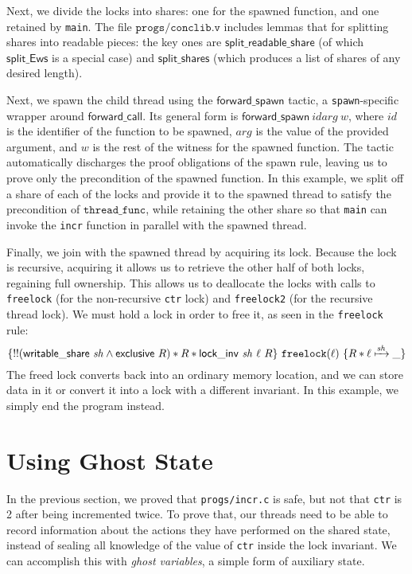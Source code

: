 \documentclass[11pt]{article} %
\begin{document}
Next, we divide the locks into shares: one for the spawned function, and one retained by \texttt{main}. The file $\texttt{progs/conclib.v}$ includes lemmas that for splitting shares into readable pieces: the key ones are $\mathsf{split\_readable\_share}$ (of which $\mathsf{split\_Ews}$ is a special case) and $\mathsf{split\_shares}$ (which produces a list of shares of any desired length).

Next, we spawn the child thread using the $\mathsf{forward\_spawn}$ tactic, a \texttt{spawn}-specific wrapper around $\mathsf{forward\_call}$. Its general form is $\mathsf{forward\_spawn}\ \mathit{id} \mathit{arg}\ \mathit{w}$, where $\mathit{id}$ is the identifier of the function to be spawned, $\mathit{arg}$ is the value of the provided argument, and $\mathit{w}$ is the rest of the witness for the spawned function. The tactic automatically discharges the proof obligations of the spawn rule, leaving us to prove only the precondition of the spawned function. In this example, we split off a share of each of the locks and provide it to the spawned thread to satisfy the precondition of $\mathtt{thread\_func}$, while retaining the other share so that \texttt{main} can invoke the \texttt{incr} function in parallel with the spawned thread.

Finally, we join with the spawned thread by acquiring its lock. Because the lock is recursive, acquiring it allows us to retrieve the other half of both locks, regaining full ownership. This allows us to deallocate the locks with calls to \texttt{freelock} (for the non-recursive \texttt{ctr} lock) and \texttt{freelock2} (for the recursive thread lock). We must hold a lock in order to free it, as seen in the \texttt{freelock} rule:
$$\{!!(\mathsf{writable\_share}\ \mathit{sh} \land \mathsf{exclusive}\ R) * R * \mathsf{lock\_inv}\ \mathit{sh}\ \ell\ R\}\ \texttt{freelock}(\ell)\ \{R * \ell \xmapsto{\mathit{sh}} \_\}$$
The freed lock converts back into an ordinary memory location, and we can store data in it or convert it into a lock with a different invariant. In this example, we simply end the program instead.

\section{Using Ghost State}
\label{ghost}
In the previous section, we proved that \texttt{progs/incr.c} is safe, but not that \texttt{ctr} is 2 after being incremented twice. To prove that, our threads need to be able to record information about the actions they have performed on the shared state, instead of sealing all knowledge of the value of \texttt{ctr} inside the lock invariant. We can accomplish this with \emph{ghost variables}, a simple form of auxiliary state.
\end{document}

